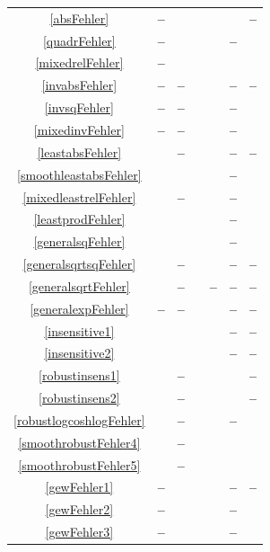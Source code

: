 \documentclass[10pt]{article}
\newcommand{\xmark}{\textbf{--}}
\begin{document}
\begin{longtable}[c]{|c||c|c|c|c|c|c|}
	\eqref{absFehler}  & \xmark &\checkmark& \checkmark& \checkmark & \checkmark & \xmark \\
	\eqref{quadrFehler} & \xmark & \checkmark & \checkmark & \checkmark & \xmark & \checkmark \\
	\eqref{mixedrelFehler} & \xmark & \checkmark & \checkmark & \checkmark & \checkmark & \checkmark \\
	\eqref{invabsFehler} & \xmark & \xmark & \checkmark & \checkmark & \xmark & \xmark \\
	\eqref{invsqFehler} & \xmark & \xmark & \checkmark & \checkmark & \xmark & \checkmark \\
	\eqref{mixedinvFehler} & \xmark & \xmark & \checkmark & \checkmark & \xmark & \checkmark \\
	\eqref{leastabsFehler} & \checkmark & \xmark & \checkmark & \checkmark & \xmark & \xmark \\
	\eqref{smoothleastabsFehler} & \checkmark &\checkmark & \checkmark & \checkmark & \xmark & \checkmark \\
	\eqref{mixedleastrelFehler} & \checkmark & \xmark & \checkmark & \checkmark & \xmark & \checkmark \\
	\eqref{leastprodFehler}  & \checkmark &\checkmark & \checkmark & \checkmark & \xmark & \checkmark \\
	\eqref{generalsqFehler} & \checkmark & \checkmark & \checkmark &\checkmark &\xmark & \checkmark \\
	\eqref{generalsqrtsqFehler} & \checkmark & \xmark & \checkmark &\checkmark & \xmark & \xmark \\
	\eqref{generalsqrtFehler} & \checkmark & \xmark & \checkmark &\xmark &\xmark & \xmark \\
	\eqref{generalexpFehler} & \xmark & \xmark & \checkmark & \checkmark & \xmark & \xmark \\
	\eqref{insensitive1}  & \checkmark &\checkmark & \checkmark& \checkmark& \xmark & \xmark \\
	\eqref{insensitive2}  & \checkmark &\checkmark&\checkmark &\checkmark & \xmark&\xmark \\
	\eqref{robustinsens1} & \checkmark &\xmark & \checkmark &\checkmark & \checkmark & \xmark \\
	\eqref{robustinsens2} & \checkmark &\xmark&\checkmark&\checkmark&\checkmark&\xmark\\
	\eqref{robustlogcoshlogFehler} & \checkmark & \xmark & \checkmark & \checkmark & \xmark & \checkmark \\
	\eqref{smoothrobustFehler4} & \checkmark & \xmark & \checkmark & \checkmark & \checkmark & \checkmark \\
	\eqref{smoothrobustFehler5} & \checkmark & \xmark & \checkmark & \checkmark & \checkmark & \checkmark \\
	\eqref{gewFehler1} & \xmark & \checkmark & \checkmark & \checkmark & \xmark & \xmark \\
	\eqref{gewFehler2} & \xmark & \checkmark & \checkmark & \checkmark & \xmark & \checkmark \\
	\eqref{gewFehler3} & \xmark & \checkmark & \checkmark & \checkmark & \xmark & \checkmark \\
\end{longtable}	
\end{document}
